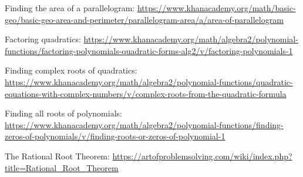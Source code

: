\begin{readinessAssuranceResources}
\item Finding the area of a parallelogram: \url{https://www.khanacademy.org/math/basic-geo/basic-geo-area-and-perimeter/parallelogram-area/a/area-of-parallelogram}
\item Factoring quadratics: \url{https://www.khanacademy.org/math/algebra2/polynomial-functions/factoring-polynomials-quadratic-forms-alg2/v/factoring-polynomials-1}
\item Finding complex roots of quadratics: \url{https://www.khanacademy.org/math/algebra2/polynomial-functions/quadratic-equations-with-complex-numbers/v/complex-roots-from-the-quadratic-formula}
\item Finding all roots of polynomials: \url{https://www.khanacademy.org/math/algebra2/polynomial-functions/finding-zeros-of-polynomials/v/finding-roots-or-zeros-of-polynomial-1}
\item The Rational Root Theorem:
\url{https://artofproblemsolving.com/wiki/index.php?title=Rational_Root_Theorem}
\end{readinessAssuranceResources}
